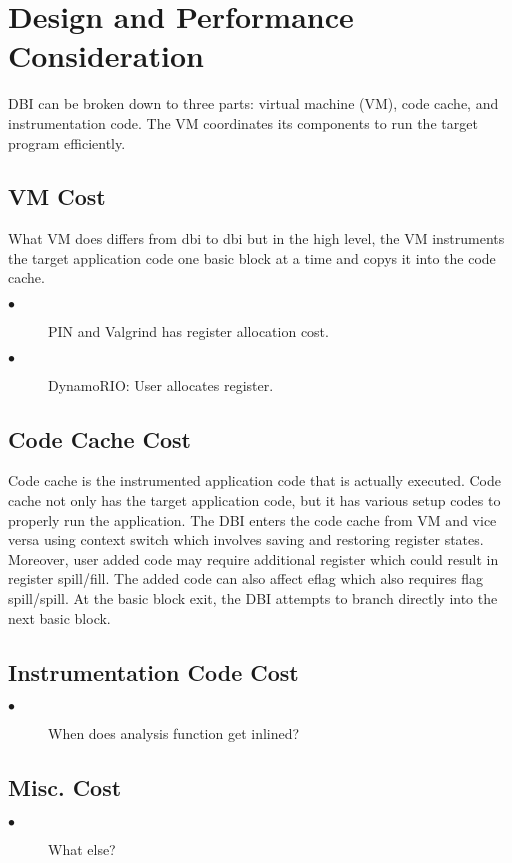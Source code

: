 \section{Design and Performance Consideration}
\label{sec:design}
DBI can be broken down to three parts: virtual machine (VM), code cache, and instrumentation code. The VM coordinates its components to run the target program efficiently. 
\subsection{VM Cost}
What VM does differs from dbi to dbi but in the high level, the VM instruments the target application code one basic block at a time and copys it into the code cache. 
\begin{description}
  \item[$\bullet$] PIN and Valgrind has register allocation cost.
  \item[$\bullet$] DynamoRIO: User allocates register.
\end{description}
\subsection{Code Cache Cost}
Code cache is the instrumented application code that is actually executed. Code cache not only has the target application code, but it has various setup codes to properly run the application. The DBI enters the code cache from VM and vice versa using context switch which involves saving and restoring register states. Moreover, user added code may require additional register which could result in register spill/fill. The added code can also affect eflag which also requires flag spill/spill. At the basic block exit, the DBI attempts to branch directly into the next basic block.
\subsection{Instrumentation Code Cost}
\begin{description}
  \item[$\bullet$] When does analysis function get inlined?
\end{description}
\subsection{Misc. Cost}
\begin{description}
  \item[$\bullet$] What else?
\end{description}
